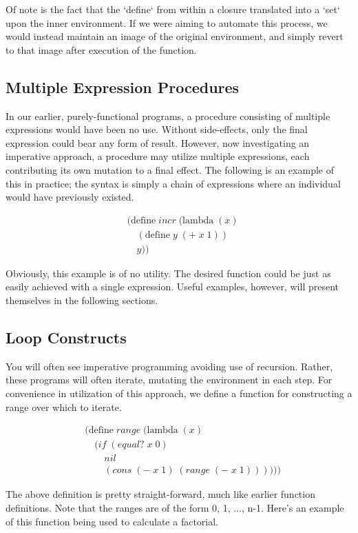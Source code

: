 Of note is the fact that the `define` from within a closure translated into a `set`
upon the inner environment. If we were aiming to automate this process, we would
instead maintain an image of the original environment, and simply revert to that 
image after execution of the function.

\subsection{Multiple Expression Procedures}
In our earlier, purely-functional programs, a procedure consisting of multiple 
expressions would have been no use. Without side-effects, only the final expression 
could bear any form of result. However, now investigating an imperative approach, 
a procedure may utilize multiple expressions, each contributing its own mutation to 
a final effect. The following is an example of this in practice; the syntax is 
simply a chain of expressions where an individual would have previously existed.

\begin{align*}
& (\text{define} \; incr \; (\text{lambda} \; (x)
\\& \quad (\text{define} \; y \; (+ \; x \; 1))
\\& \quad y))
\end{align*}

Obviously, this example is of no utility. The desired function could be just as 
easily achieved with a single expression. Useful examples, however, will present 
themselves in the following sections.

\subsection{Loop Constructs}
You will often see imperative programming avoiding use of recursion. Rather, these 
programs will often iterate, mutating the environment in each step. For convenience 
in utilization of this approach, we define a function for constructing a range over 
which to iterate.

\begin{align*}
& (\text{define} \; range \; (\text{lambda} \; (x)
\\& \quad (if \; (equal? \; x \; 0)
\\& \qquad nil
\\& \qquad (cons \; (- \; x \; 1) \; (range \; (- \; x \; 1))))))
\end{align*}

The above definition is pretty straight-forward, much like earlier function 
definitions. Note that the ranges are of the form 0, 1, ..., n-1. Here's an example 
of this function being used to calculate a factorial.

